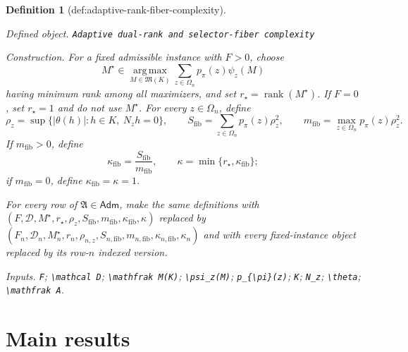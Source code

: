 \documentclass{article}
\newtheorem{definition}{Definition}
\begin{document}
\begin{definition}[def:adaptive-rank-fiber-complexity]\label{def:adaptive-rank-fiber-complexity}
\par\smallskip\noindent\emph{Defined object.} \texttt{Adaptive dual-\allowbreak{}rank and selector-\allowbreak{}fiber complexity}
\par\smallskip\noindent\emph{Construction.} For a fixed admissible instance with \(F>0\), choose
\[
 M^{\star}\in\operatorname*{arg\,max}_{M\in\mathfrak M(K)}
 \sum_{z\in\Omega_n}p_{\pi}(z)\psi_z(M)
\]
having minimum rank among all maximizers, and set \(r_{\star}=\operatorname{rank}(M^{\star})\). If \(F=0\), set \(r_{\star}=1\) and do not use \(M^{\star}\). For every \(z\in\Omega_n\), define
\[
 \rho_z=\sup\{\lvert\theta(h)\rvert:h\in K,\ N_zh=0\},\qquad
 S_{\mathrm{fib}}=\sum_{z\in\Omega_n}p_{\pi}(z)\rho_z^2,
 \qquad
 m_{\mathrm{fib}}=\max_{z\in\Omega_n}p_{\pi}(z)\rho_z^2.
\]
If \(m_{\mathrm{fib}}>0\), define
\[
 \kappa_{\mathrm{fib}}=\frac{S_{\mathrm{fib}}}{m_{\mathrm{fib}}},
 \qquad
 \kappa=\min\{r_{\star},\kappa_{\mathrm{fib}}\};
\]
if \(m_{\mathrm{fib}}=0\), define \(\kappa_{\mathrm{fib}}=\kappa=1\).

For every row of \(\mathfrak A\in\mathsf{Adm}\), make the same definitions with \((F,\mathcal D,M^{\star},r_{\star},\rho_z,S_{\mathrm{fib}},m_{\mathrm{fib}},\kappa_{\mathrm{fib}},\kappa)\) replaced by \((F_n,\mathcal D_n,M_n^{\star},r_n,\rho_{n,z},S_{n,\mathrm{fib}},m_{n,\mathrm{fib}},\kappa_{n,\mathrm{fib}},\kappa_n)\) and with every fixed-instance object replaced by its row-\(n\) indexed version.
\par\smallskip\noindent\emph{Inputs.} \texttt{F}; \texttt{\textbackslash{}\allowbreak{}mathcal D}; \texttt{\textbackslash{}\allowbreak{}mathfrak M(K)}; \texttt{\textbackslash{}\allowbreak{}psi\_\allowbreak{}z(M)}; \texttt{p\_\allowbreak{}\{\textbackslash{}\allowbreak{}pi\}\allowbreak{}(z)}; \texttt{K}; \texttt{N\_\allowbreak{}z}; \texttt{\textbackslash{}\allowbreak{}theta}; \texttt{\textbackslash{}\allowbreak{}mathfrak A}.
\end{definition}

\section{Main results}
\end{document}
